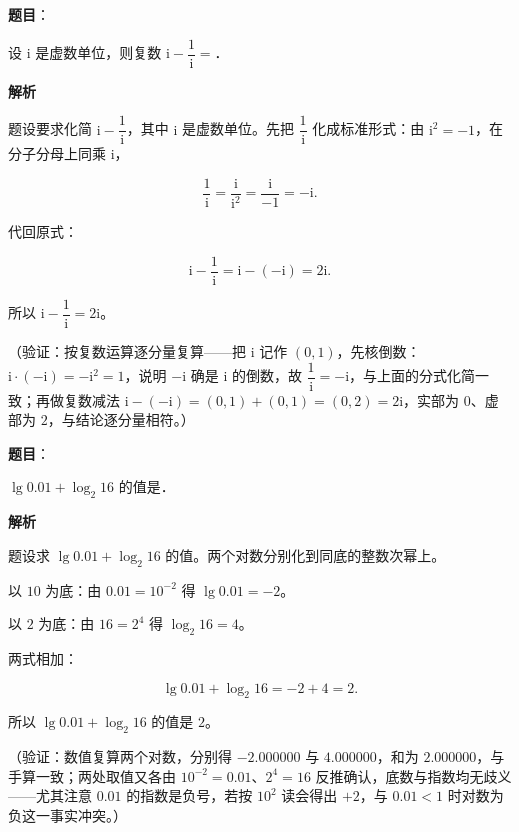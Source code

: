 \begin{answer}

\textbf{题目}：

设 \(\mathrm{i}\) 是虚数单位，则复数 \(\mathrm{i}-\dfrac{1}{\mathrm{i}}=\)\gkblank{}．

\textbf{解析}

题设要求化简 \(\mathrm{i}-\dfrac{1}{\mathrm{i}}\)，其中 \(\mathrm{i}\) 是虚数单位。先把 \(\dfrac{1}{\mathrm{i}}\) 化成标准形式：由 \(\mathrm{i}^{2}=-1\)，在分子分母上同乘 \(\mathrm{i}\)，

\nopagebreak[4]
\[
\frac{1}{\mathrm{i}}=\frac{\mathrm{i}}{\mathrm{i}^{2}}=\frac{\mathrm{i}}{-1}=-\mathrm{i}.
\]

代回原式：

\nopagebreak[4]
\[
\mathrm{i}-\dfrac{1}{\mathrm{i}}=\mathrm{i}-(-\mathrm{i})=2\mathrm{i}.
\]

所以 \(\mathrm{i}-\dfrac{1}{\mathrm{i}}=2\mathrm{i}\)。

（验证：按复数运算逐分量复算——把 \(\mathrm{i}\) 记作 \((0,1)\)，先核倒数：\(\mathrm{i}\cdot(-\mathrm{i})=-\mathrm{i}^{2}=1\)，说明 \(-\mathrm{i}\) 确是 \(\mathrm{i}\) 的倒数，故 \(\dfrac{1}{\mathrm{i}}=-\mathrm{i}\)，与上面的分式化简一致；再做复数减法 \(\mathrm{i}-(-\mathrm{i})=(0,1)+(0,1)=(0,2)=2\mathrm{i}\)，实部为 \(0\)、虚部为 \(2\)，与结论逐分量相符。）


\end{answer}
\begin{answer}

\textbf{题目}：

\(\lg 0.01+\log_2 16\) 的值是\gkblank{}．

\textbf{解析}

题设求 \(\lg 0.01+\log_2 16\) 的值。两个对数分别化到同底的整数次幂上。

以 \(10\) 为底：由 \(0.01=10^{-2}\) 得 \(\lg 0.01=-2\)。

以 \(2\) 为底：由 \(16=2^{4}\) 得 \(\log_2 16=4\)。

两式相加：

\nopagebreak[4]
\[
\lg 0.01+\log_2 16=-2+4=2.
\]

所以 \(\lg 0.01+\log_2 16\) 的值是 \(2\)。

（验证：数值复算两个对数，分别得 \(-2.000000\) 与 \(4.000000\)，和为 \(2.000000\)，与手算一致；两处取值又各由 \(10^{-2}=0.01\)、\(2^{4}=16\) 反推确认，底数与指数均无歧义——尤其注意 \(0.01\) 的指数是负号，若按 \(10^{2}\) 读会得出 \(+2\)，与 \(0.01<1\) 时对数为负这一事实冲突。）


\end{answer}
